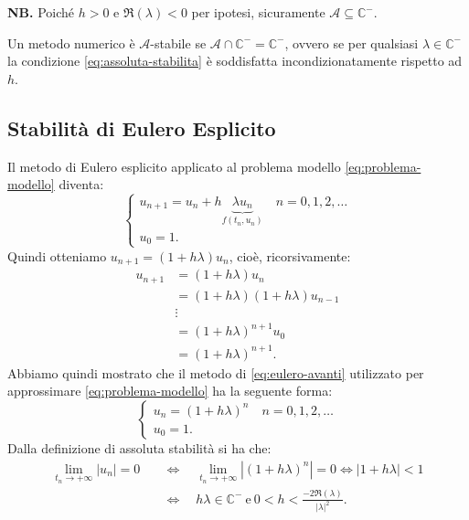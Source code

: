 \textbf{NB.}
Poiché $h >0$ e $\Re ( \lambda ) < 0$ per ipotesi, sicuramente $\mathcal{A} \subseteq \mathbb{C}^{-}$.

\begin{definition}
Un metodo numerico è $\mathcal{A}$-stabile se $\mathcal{A} \cap \mathbb{C}^{-} =\mathbb{C}^{-}$, ovvero se per qualsiasi $\lambda \in \mathbb{C}^{-}$ la condizione \eqref{eq:assoluta-stabilita} è soddisfatta incondizionatamente rispetto ad $h$.
\end{definition}

\subsection{Stabilità di Eulero Esplicito}
Il metodo di Eulero esplicito applicato al problema modello \eqref{eq:problema-modello} diventa:
\begin{equation*}
\begin{cases}
u_{n+1} =u_{n} +h\underbrace{\lambda u_{n}}_{f( t_{n} ,u_{n})} \quad n=0,1,2,\dotsc \\
u_{0} =1.
\end{cases}
\end{equation*}
Quindi otteniamo $u_{n+1} =( 1+h\lambda ) u_{n}$, cioè, ricorsivamente:
\begin{align*}
u_{n+1} & =( 1+h\lambda ) u_{n}\\
 & =( 1+h\lambda )( 1+h\lambda ) u_{n-1}\\
 & \vdots \\
 & =( 1+h\lambda )^{n+1} u_{0}\\
 & =( 1+h\lambda )^{n+1}.
\end{align*}
Abbiamo quindi mostrato che il metodo di \eqref{eq:eulero-avanti} utilizzato per approssimare \eqref{eq:problema-modello} ha la seguente forma:
\begin{equation*}
\begin{cases}
u_{n} =( 1+h\lambda )^{n} \quad n=0,1,2,\dotsc \\
u_{0} =1.
\end{cases}
\end{equation*}
Dalla definizione di assoluta stabilità si ha che:
\begin{align}
\lim _{t_{n}\rightarrow +\infty }| u_{n}| =0 \quad  & \Leftrightarrow \quad\lim _{t_{n}\rightarrow +\infty }\left| ( 1+h\lambda )^{n}\right| =0\Leftrightarrow | 1+h\lambda | < 1 \\
													& \Leftrightarrow \quad h\lambda \in \mathbb{C}^{-} \ \text{e} \ 0< h< \frac{-2\Re ( \lambda )}{| \lambda | ^{2}}.
\label{eq:A-stab-ee}
\end{align}


